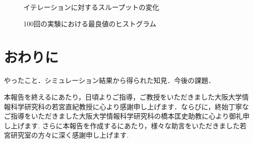 \documentclass[a4paper,11pt]{jarticle}
\begin{document}
\begin{figure}[t]
  \centering
  
  \caption{イテレーションに対するスループットの変化}
  \label{hetero}
\end{figure}

\begin{figure}[t]
  \centering
  
  \caption{100回の実験における最良値のヒストグラム}
  \label{histogram}
\end{figure}

\section{おわりに}
やったこと．シミュレーション結果から得られた知見．今後の課題．

\acknowledgement
本報告を終えるにあたり，日頃よりご指導，ご教授をいただきました大阪大学情報科学研究科の若宮直紀教授に心より感謝申し上げます．ならびに，終始丁寧なご指導をいただきました大阪大学情報科学研究科の橋本匡史助教に心より御礼申し上げます. さらに本報告を作成するにあたり，様々な助言をいただきました若宮研究室の方々に深く感謝申し上げます.



\end{document}
